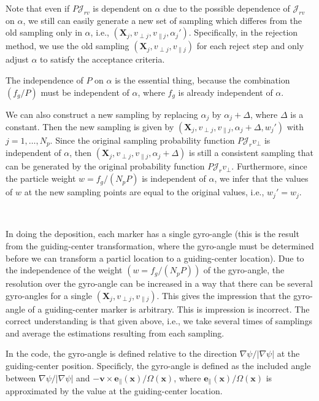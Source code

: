 \documentclass{llncs}
\begin{document}
Note that even if $P \mathcal{J}_{r v}$ is dependent on $\alpha$ due to the
possible dependence of $\mathcal{J}_{r v}$ on $\alpha$, we still can easily
generate a new set of sampling which differes from the old sampling only in
$\alpha$, i.e., $(\mathbf{X}_j, v_{\perp j}, v_{\parallel j}, \alpha_j')$.
Specifically, in the rejection method, we use the old sampling $(\mathbf{X}_j,
v_{\perp j}, v_{\parallel j})$ for each reject step and only adjust $\alpha$
to satisfy the acceptance criteria.

The independence of $P$ on $\alpha$ is the essential thing, because the
combination $(f_g / P)$ must be independent of $\alpha$, where $f_g$ is
already independent of $\alpha$.

We can also construct a new sampling by replacing $\alpha_j$ by $\alpha_j +
\Delta$, where $\Delta$ is a constant. Then the new sampling is given by
$(\mathbf{X}_j, v_{\perp j}, v_{\parallel j}, \alpha_j + \Delta, w_j')$ with
$j = 1, \ldots, N_p$. Since the original sampling probability function $P
\mathcal{J}_r v_{\perp}$ is independent of $\alpha$, then $(\mathbf{X}_j,
v_{\perp j}, v_{\parallel j}, \alpha_j + \Delta)$ is still a consistent
sampling that can be generated by the original probability function $P
\mathcal{J}_r v_{\perp}$. Furthermore, since the particle weight $w = f_g /
(N_p P)$ is independent of $\alpha$, we infer that the values of $w$ at the
new sampling points are equal to the original values, i.e., $w_j' = w_j$.

\

In doing the deposition, each marker has a single gyro-angle (this is the
result from the guiding-center transformation, where the gyro-angle must be
determined before we can transform a particl location to a guiding-center
location). Due to the independence of the weight $(w = f_g / (N_p P))$ of the
gyro-angle, the resolution over the gyro-angle can be increased in a way that
there can be several gyro-angles for a single $(\mathbf{X}_j, v_{\perp j},
v_{\parallel j})$. This gives the impression that the gyro-angle of a
guiding-center marker is arbitrary. This is impression is incorrect. The
correct understanding is that given above, i.e., we take several times of
samplings and average the estimations resulting from each sampling.

In the code, the gyro-angle is defined relative to the direction $\nabla \psi
/ | \nabla \psi |$ at the guiding-center position. Specificly, the gyro-angle
is defined as the included angle between $\nabla \psi / | \nabla \psi |$ and
$-\mathbf{v} \times \mathbf{e}_{\parallel} (\mathbf{x}) / \Omega
(\mathbf{x})$, where $\mathbf{e}_{\parallel} (\mathbf{x}) / \Omega
(\mathbf{x})$ is approximated by the value at the guiding-center location.
\end{document}
